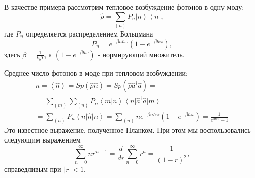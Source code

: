 В качестве примера рассмотрим тепловое возбуждение фотонов в одну
моду:
\begin{equation}
\hat{\rho} = \sum_{(n)}
P_n\left|n\right>\left<n\right|,
\label{eqCh1_teplovvozb}
\end{equation}
где $P_n$ определяется распределением Больцмана
\[
P_n = e^{-\beta n \hbar \omega}\left(1  -  e^{-\beta \hbar \omega}\right),
\]
здесь  $\beta = \frac{1}{k_b T}$, а $\left(1  -  e^{-\beta \hbar
  \omega}\right)$ - нормирующий множитель. 

Среднее число фотонов в моде при тепловом возбуждении:
\begin{eqnarray}
\bar{n} = \left<\hat{n}\right> =  Sp \left(\hat{\rho}\hat{n}\right) = 
Sp \left(\hat{\rho}\hat{a}^{\dag}\hat{a}\right) = 
\nonumber \\
=\sum_{(m)}\sum_{(n)}
P_n\left<m\right|\left.n\right>\left<n\right|\hat{a}^{\dag}\hat{a}\left|m\right>
= 
\nonumber \\
= \sum_{(n)}
P_n\left<n\right|\hat{n}\left|n\right> = \sum_{(n)} n
e^{-\beta n \hbar \omega}\left(1  -  e^{-\beta \hbar \omega}\right) = 
\frac{1}{e^{\beta \hbar \omega} - 1}
\label{eqCh1_plank}
\end{eqnarray}
Это известное выражение, полученное Планком. При этом мы
воспользовались следующим выражением
\[
\sum_{n=0}^{\infty} n r^{n -1} = \frac{d}{d r} \sum_{n=0}^{\infty}
r^{n} = \frac{1}{\left(1 - r\right)^2},
\]
справедливым при $\left|r\right| < 1$.

